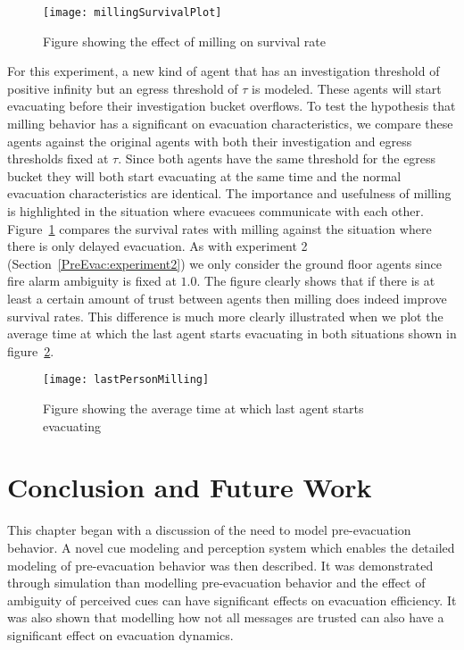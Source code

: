 \begin{figure}[!tb]
    \centering
        \texttt{[image: millingSurvivalPlot]}

    \caption{Figure showing the effect of milling on survival rate}
    \label{fig:MillingSurvivalPlot}
\end{figure}
For this experiment, a new kind of agent that has an investigation threshold of positive infinity but an egress threshold of $\tau$ is modeled. These agents will start evacuating before their investigation bucket overflows. To test the hypothesis that milling behavior has a significant on evacuation characteristics, we compare these agents against the original agents with both their investigation and egress thresholds fixed at $\tau$. Since both agents have the same threshold for the egress bucket they will both start evacuating at the same time and the normal evacuation characteristics are identical. The importance and usefulness of milling is highlighted in the situation where evacuees communicate with each other. Figure~\ref{fig:MillingSurvivalPlot} compares the survival rates with milling against the situation where there is only delayed evacuation. As with experiment 2 (Section~\ref{PreEvac:experiment2}) we only consider the ground floor agents since fire alarm ambiguity is fixed at $1.0$. The figure clearly shows that if there is at least a certain amount of trust between agents then milling does indeed improve survival rates. This difference is much more clearly illustrated when we plot the average time at which the last agent starts evacuating in both situations shown in figure~\ref{fig:MillingLastPerson}.

\begin{figure}[!tb]
    \centering
        \texttt{[image: lastPersonMilling]}
    \caption{Figure showing the average time at which last agent starts evacuating}
    \label{fig:MillingLastPerson}
\end{figure}

\section{Conclusion and Future Work}
\label{PreEvac:ConclusionAndFutureWork}

This chapter began with a discussion of the need to model pre-evacuation behavior. A novel cue modeling and perception system which enables the detailed modeling of pre-evacuation behavior was then described. It was demonstrated through simulation than modelling pre-evacuation behavior and the effect of ambiguity of perceived cues can have significant effects on evacuation efficiency. It was also shown that modelling how not all messages are trusted can also have a significant effect on evacuation dynamics.

